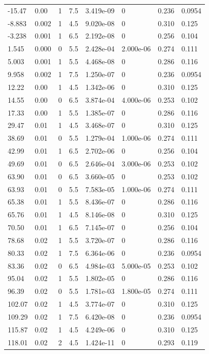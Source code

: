 \documentclass[preview]{standalone}
\begin{document}
{{\begin{tabular}{L{1.2cm}C{1.2cm} C{0.3cm}C{0.5cm} C{1.4cm}C{1.4cm} C{1.4cm}C{1.4cm}}
  -15.47  &  0.00  & 1     & 7.5 &  3.419e-09  & 0  & 0.236 &  0.0954   \\ 
  -8.883  &  0.002  & 1     & 4.5 &  9.020e-08  & 0  & 0.310 &  0.125   \\ 
  -3.238  &  0.001  & 1     & 6.5 &  2.192e-08  & 0  & 0.256 &  0.104   \\ 
  1.545  &  0.000  & 0     & 5.5 &  2.428e-04  & 2.000e-06  & 0.274 &  0.111   \\ 
  5.003  &  0.001  & 1     & 5.5 &  4.468e-08  & 0  & 0.286 &  0.116   \\ 
  9.958  &  0.002  & 1     & 7.5 &  1.250e-07  & 0  & 0.236 &  0.0954   \\ 
  12.22  &  0.00  & 1     & 4.5 &  1.342e-06  & 0  & 0.310 &  0.125   \\ 
  14.55  &  0.00  & 0     & 6.5 &  3.874e-04  & 4.000e-06  & 0.253 &  0.102   \\ 
  17.33  &  0.00  & 1     & 5.5 &  1.385e-07  & 0  & 0.286 &  0.116   \\ 
  29.47  &  0.01  & 1     & 4.5 &  3.468e-07  & 0  & 0.310 &  0.125   \\ 
  38.69  &  0.01  & 0     & 5.5 &  1.279e-04  & 1.000e-06  & 0.274 &  0.111   \\ 
  42.99  &  0.01  & 1     & 6.5 &  2.702e-06  & 0  & 0.256 &  0.104   \\ 
  49.69  &  0.01  & 0     & 6.5 &  2.646e-04  & 3.000e-06  & 0.253 &  0.102   \\ 
  63.90  &  0.01  & 0     & 6.5 &  3.660e-05  & 0  & 0.253 &  0.102   \\ 
  63.93  &  0.01  & 0     & 5.5 &  7.583e-05  & 1.000e-06  & 0.274 &  0.111   \\ 
  65.38  &  0.01  & 1     & 5.5 &  8.436e-07  & 0  & 0.286 &  0.116   \\ 
  65.76  &  0.01  & 1     & 4.5 &  8.146e-08  & 0  & 0.310 &  0.125   \\ 
  70.50  &  0.01  & 1     & 6.5 &  7.145e-07  & 0  & 0.256 &  0.104   \\ 
  78.68  &  0.02  & 1     & 5.5 &  3.720e-07  & 0  & 0.286 &  0.116   \\ 
  80.33  &  0.02  & 1     & 7.5 &  6.364e-06  & 0  & 0.236 &  0.0954   \\ 
  83.36  &  0.02  & 0     & 6.5 &  4.984e-03  & 5.000e-05  & 0.253 &  0.102   \\ 
  95.04  &  0.02  & 1     & 5.5 &  1.802e-05  & 0  & 0.286 &  0.116   \\ 
  96.39  &  0.02  & 0     & 5.5 &  1.781e-03  & 1.800e-05  & 0.274 &  0.111   \\ 
  102.07  &  0.02  & 1     & 4.5 &  3.774e-07  & 0  & 0.310 &  0.125   \\ 
  109.29  &  0.02  & 1     & 7.5 &  6.420e-08  & 0  & 0.236 &  0.0954   \\ 
  115.87  &  0.02  & 1     & 4.5 &  4.249e-06  & 0  & 0.310 &  0.125   \\ 
  118.01  &  0.02  & 2     & 4.5 &  1.424e-11  & 0  & 0.293 &  0.119   \\ 
\hline 
\end{tabular} 

}}
\end{document}
